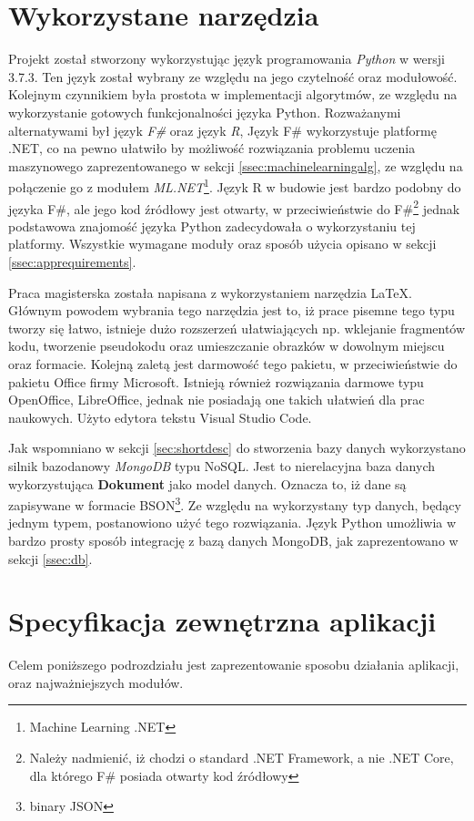 \section{Wykorzystane narzędzia}
\label{sec:tools}
Projekt został stworzony wykorzystując język programowania \emph{Python} \cite{Python} w wersji 3.7.3. Ten język został wybrany ze względu na jego czytelność oraz modułowość. Kolejnym czynnikiem była prostota w implementacji algorytmów, ze względu na wykorzystanie gotowych funkcjonalności języka Python. Rozważanymi alternatywami był język \emph{F\#} oraz język \emph{R}, Język F\# wykorzystuje platformę .NET, co na pewno ułatwiło by możliwość rozwiązania problemu uczenia maszynowego zaprezentowanego w sekcji \ref{ssec:machinelearningalg}, ze względu na połączenie go z modułem \emph{ML.NET}\footnote{Machine Learning .NET}. Język R w budowie jest bardzo podobny do języka F\#, ale jego kod źródłowy jest otwarty, w przeciwieństwie do F\#\footnote{Należy nadmienić, iż chodzi o standard .NET Framework, a nie .NET Core, dla którego F\# posiada otwarty kod źródłowy} jednak podstawowa znajomość języka Python zadecydowała o wykorzystaniu tej platformy. Wszystkie wymagane moduły oraz sposób użycia opisano w sekcji \ref{ssec:apprequirements}.\par
Praca magisterska została napisana z wykorzystaniem narzędzia \LaTeX\cite{Latex}. Głównym powodem wybrania tego narzędzia jest to, iż prace pisemne tego typu tworzy się łatwo, istnieje dużo rozszerzeń ułatwiających np. wklejanie fragmentów kodu, tworzenie pseudokodu oraz umieszczanie obrazków w dowolnym miejscu oraz formacie. Kolejną zaletą jest darmowość tego pakietu, w przeciwieństwie do pakietu Office firmy Microsoft. Istnieją również rozwiązania darmowe typu OpenOffice, LibreOffice, jednak nie posiadają one takich ułatwień dla prac naukowych. Użyto edytora tekstu Visual Studio Code.\par
Jak wspomniano w sekcji \ref{sec:shortdesc} do stworzenia bazy danych wykorzystano silnik bazodanowy \emph{MongoDB} typu NoSQL. Jest to nierelacyjna baza danych wykorzystująca \textbf{Dokument} jako model danych. Oznacza to, iż dane są zapisywane w formacie BSON\footnote{binary JSON}. Ze względu na wykorzystany typ danych, będący jednym typem, postanowiono użyć tego rozwiązania. Język Python umożliwia w bardzo prosty sposób integrację z bazą danych MongoDB, jak zaprezentowano w sekcji \ref{ssec:db}.
\section{Specyfikacja zewnętrzna aplikacji}
Celem poniższego podrozdziału jest zaprezentowanie sposobu działania aplikacji, oraz najważniejszych modułów.
